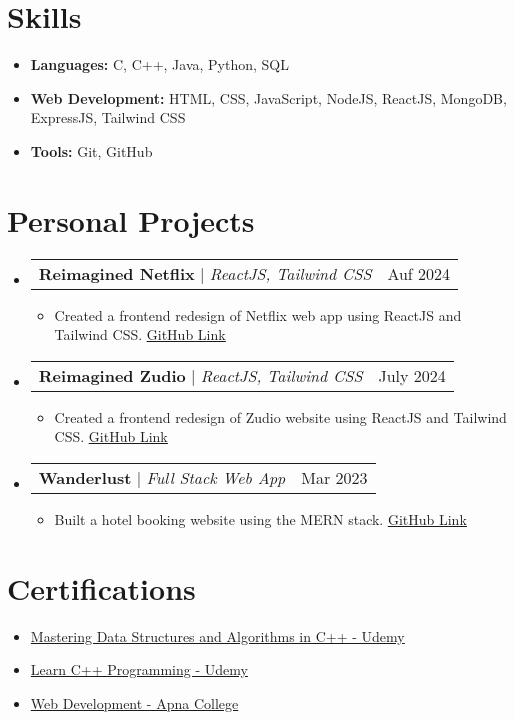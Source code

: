 \documentclass[letterpaper,11pt]{article}
\makeatletter
\newcommand{\resumeItem}[1]{\item\small{#1 \vspace{-2pt}}}
\newcommand{\resumeProjectHeading}[2]{\item\begin{tabular*}{0.97\textwidth}{l@{\extracolsep{\fill}}r}\small#1 & #2 \\ \end{tabular*}\vspace{-7pt}}
\newcommand{\resumeSubHeadingListStart}{\begin{itemize}[leftmargin=0.15in, label={}]}
\newcommand{\resumeSubHeadingListEnd}{\end{itemize}}
\newcommand{\resumeItemListStart}{\begin{itemize}}
\newcommand{\resumeItemListEnd}{\end{itemize}\vspace{-5pt}}
\makeatother
\begin{document}
\section{\textbf{Skills}}
\begin{itemize}[leftmargin=*, itemsep=-2pt]
    \item \textbf{Languages:} C, C++, Java, Python, SQL
    \item \textbf{Web Development:} HTML, CSS, JavaScript, NodeJS, ReactJS, MongoDB, ExpressJS, Tailwind CSS
    \item \textbf{Tools:} Git, GitHub
\end{itemize}


\section{\textbf{Personal Projects}}
\resumeSubHeadingListStart
\resumeProjectHeading
{\textbf{Reimagined Netflix} $|$ \footnotesize \emph{ReactJS, Tailwind CSS}}{Auf 2024}
\resumeItemListStart
\resumeItem{Created a frontend redesign of Netflix web app using ReactJS and Tailwind CSS. \href{https://api-alchemists-reimagine-round2.vercel.app/}{\underline{GitHub Link}}}
\resumeItemListEnd

\resumeProjectHeading
{\textbf{Reimagined Zudio} $|$ \footnotesize \emph{ReactJS, Tailwind CSS}}{July 2024}
\resumeItemListStart
\resumeItem{Created a frontend redesign of Zudio website using ReactJS and Tailwind CSS. \href{https://api-alchemists-reimagine-round1.vercel.app/}{\underline{GitHub Link}}}
\resumeItemListEnd

\resumeProjectHeading
{\textbf{Wanderlust} $|$ \footnotesize \emph{Full Stack Web App}}{Mar 2023}
\resumeItemListStart
\resumeItem{Built a hotel booking website using the MERN stack. \href{https://major-project-xdfh.onrender.com/listings}{\underline{GitHub Link}}}
\resumeItemListEnd
\resumeSubHeadingListEnd


\section{\textbf{Certifications}}
\begin{itemize}[leftmargin=*, itemsep=-5pt]
    \item \href{https://www.udemy.com/certificate/UC-690ca4e6-b24d-4551-b1d6-edd57ff97ad3/}{Mastering Data Structures and Algorithms in C++ - Udemy}
    \item \href{https://www.udemy.com/certificate/UC-d5e22d52-cbe1-40ae-9148-d1722c71d680/}{Learn C++ Programming - Udemy}
    \item \href{https://drive.google.com/file/d/1Ym6y97-HAdRvaqvt4BSZHDbz_YDCas2E/view?usp=drive_link}{Web Development - Apna College}
\end{itemize}
\end{document}
